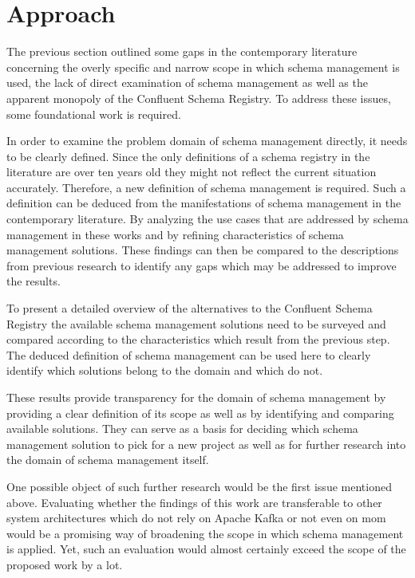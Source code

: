 
\section{Approach}\label{sec:approach}

The previous section outlined some gaps in the contemporary literature concerning the overly specific and narrow scope in which schema management is used, the lack of direct examination of schema management as well as the apparent monopoly of the Confluent Schema Registry.
To address these issues, some foundational work is required.

In order to examine the problem domain of schema management directly, it needs to be clearly defined.
Since the only definitions of a schema registry in the literature are over ten years old \parencites(see)(){heery_metadata_2003}{ma_iip_2010}{kreps_kafka_2011} they might not reflect the current situation accurately.
Therefore, a new definition of schema management is required.
Such a definition can be deduced from the manifestations of schema management in the contemporary literature.
By analyzing the use cases that are addressed by schema management in these works and by refining characteristics of schema management solutions.
These findings can then be compared to the descriptions from previous research to identify any gaps which may be addressed to improve the results.

To present a detailed overview of the alternatives to the Confluent Schema Registry the available schema management solutions need to be surveyed and compared according to the characteristics which result from the previous step.
The deduced definition of schema management can be used here to clearly identify which solutions belong to the domain and which do not.

These results provide transparency for the domain of schema management by providing a clear definition of its scope as well as by identifying and comparing available solutions.
They can serve as a basis for deciding which schema management solution to pick for a new project as well as for further research into the domain of schema management itself.

One possible object of such further research would be the first issue mentioned above.
Evaluating whether the findings of this work are transferable to other system architectures which do not rely on Apache Kafka or not even on \gls{mom} would be a promising way of broadening the scope in which schema management is applied.
Yet, such an evaluation would almost certainly exceed the scope of the proposed work by a lot.
